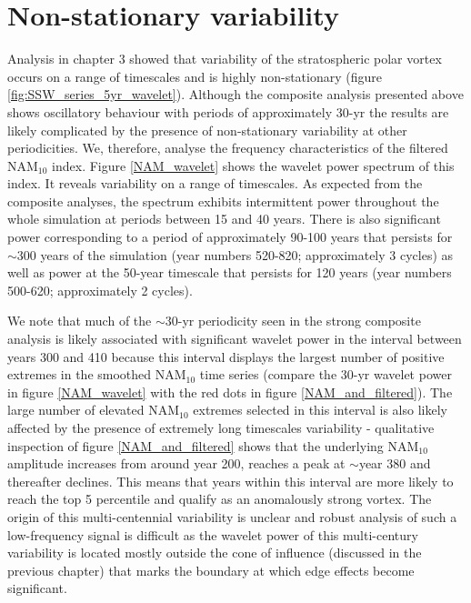 \section{Non-stationary variability}
Analysis in chapter 3 showed that variability of the stratospheric polar vortex  occurs on a range of timescales and is highly non-stationary  (figure \ref{fig:SSW_series_5yr_wavelet}). Although the composite analysis presented above shows oscillatory behaviour with periods of approximately 30-yr the results are likely complicated by the presence of  non-stationary variability at other periodicities.  We, therefore, analyse the frequency characteristics of the filtered NAM$_{10}$ index. Figure \ref{NAM_wavelet} shows the wavelet power spectrum of this index. It reveals variability on a range of timescales. As expected from the composite analyses, the spectrum exhibits intermittent power throughout the whole simulation at periods between 15 and 40 years. There is also significant power corresponding to a period of approximately 90-100 years that persists for $\sim$300 years of the simulation (year numbers 520-820; approximately 3 cycles) as well as power at the 50-year timescale that persists for 120 years (year numbers 500-620; approximately 2 cycles). 

We note that much of the $\sim$30-yr periodicity seen in the strong composite analysis is likely associated with significant wavelet power in the interval between years 300 and 410 because this interval displays the largest number of positive extremes in the smoothed NAM$_{10}$ time series (compare the 30-yr wavelet power in figure \ref{NAM_wavelet} with  the red dots in figure \ref{NAM_and_filtered}). The large number of elevated NAM$_{10}$ extremes selected in this interval is also likely affected by the presence of extremely long timescales variability - qualitative inspection of figure \ref{NAM_and_filtered} shows that the underlying NAM$_{10}$ amplitude increases from around year 200, reaches a peak at $\sim$year 380 and thereafter declines. This means that years within this interval are more likely to reach the top 5 percentile and qualify as an anomalously strong vortex. The origin of this multi-centennial variability is unclear and robust analysis of such a low-frequency signal is difficult as the wavelet power of this multi-century variability is located mostly outside the cone of influence (discussed in the previous chapter) that marks the boundary at which edge effects become significant. 

